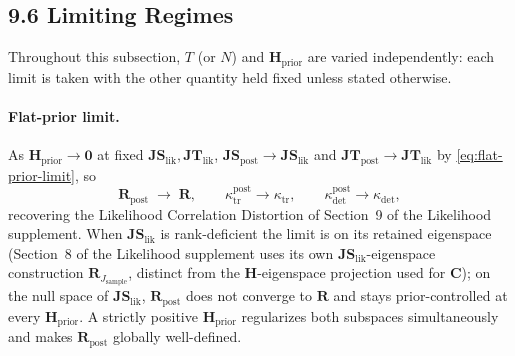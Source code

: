 \documentclass[11pt]{article}
\begin{document}
\subsection*{9.6 Limiting Regimes}

Throughout this subsection, $T$ (or $N$) and $\mathbf H_{\mathrm{prior}}$ are varied independently: each limit is taken with the other quantity held fixed unless stated otherwise.

\paragraph{Flat-prior limit.}
As $\mathbf H_{\mathrm{prior}} \to \mathbf 0$ at fixed $\mathbf{JS}_{\mathrm{lik}}, \mathbf{JT}_{\mathrm{lik}}$, $\mathbf{JS}_{\mathrm{post}} \to \mathbf{JS}_{\mathrm{lik}}$ and $\mathbf{JT}_{\mathrm{post}} \to \mathbf{JT}_{\mathrm{lik}}$ by \eqref{eq:flat-prior-limit}, so
\begin{equation}
\mathbf R_{\mathrm{post}} \;\longrightarrow\; \mathbf R,
\qquad
\kappa_{\mathrm{tr}}^{\mathrm{post}} \to \kappa_{\mathrm{tr}},
\qquad
\kappa_{\mathrm{det}}^{\mathrm{post}} \to \kappa_{\mathrm{det}},
\label{eq:posterior-r-flat-limit}
\end{equation}
recovering the Likelihood Correlation Distortion of Section~9 of the Likelihood supplement. When $\mathbf{JS}_{\mathrm{lik}}$ is rank-deficient the limit is on its retained eigenspace (Section~8 of the Likelihood supplement uses its own $\mathbf{JS}_{\mathrm{lik}}$-eigenspace construction $\mathbf R_{J_{\mathrm{sample}}}$, distinct from the $\mathbf H$-eigenspace projection used for $\mathbf C$); on the null space of $\mathbf{JS}_{\mathrm{lik}}$, $\mathbf R_{\mathrm{post}}$ does not converge to $\mathbf R$ and stays prior-controlled at every $\mathbf H_{\mathrm{prior}}$. A strictly positive $\mathbf H_{\mathrm{prior}}$ regularizes both subspaces simultaneously and makes $\mathbf R_{\mathrm{post}}$ globally well-defined.
\end{document}
